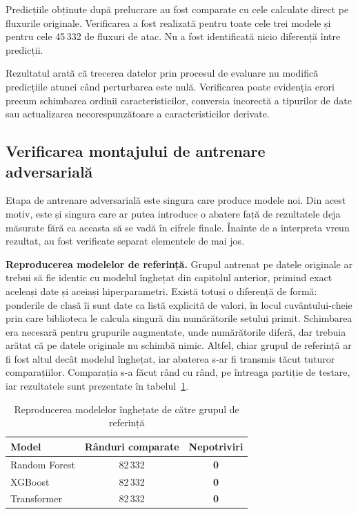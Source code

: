 Predicțiile obținute după prelucrare au fost comparate cu cele calculate direct pe fluxurile originale. Verificarea a fost realizată pentru toate cele trei modele și pentru cele 45\,332 de fluxuri de atac. Nu a fost identificată nicio diferență între predicții.

Rezultatul arată că trecerea datelor prin procesul de evaluare nu modifică predicțiile atunci când perturbarea este nulă. Verificarea poate evidenția erori precum schimbarea ordinii caracteristicilor, conversia incorectă a tipurilor de date sau actualizarea necorespunzătoare a caracteristicilor derivate.

\subsection{Verificarea montajului de antrenare adversarială}\label{subsec:val-adversarial}

Etapa de antrenare adversarială este singura care produce modele noi. Din acest motiv, este și singura care ar putea introduce o abatere față de rezultatele deja măsurate fără ca aceasta să se vadă în cifrele finale. Înainte de a interpreta vreun rezultat, au fost verificate separat elementele de mai jos.

\textbf{Reproducerea modelelor de referință.} Grupul antrenat pe datele originale ar trebui să fie identic cu modelul înghețat din capitolul anterior, primind exact aceleași date și aceiași hiperparametri. Există totuși o diferență de formă: ponderile de clasă îi sunt date ca listă explicită de valori, în locul cuvântului-cheie prin care biblioteca le calcula singură din numărătorile setului primit. Schimbarea era necesară pentru grupurile augmentate, unde numărătorile diferă, dar trebuia arătat că pe datele originale nu schimbă nimic. Altfel, chiar grupul de referință ar fi fost altul decât modelul înghețat, iar abaterea s-ar fi transmis tăcut tuturor comparațiilor. Comparația s-a făcut rând cu rând, pe întreaga partiție de testare, iar rezultatele sunt prezentate în tabelul~\ref{tab:reproducere}.

\begin{table}[!ht]
    \caption{Reproducerea modelelor înghețate de către grupul de referință}
    \centering
    \begin{tabular}{|l|c|c|}
        \hline
        \textbf{Model} & \textbf{Rânduri comparate} & \textbf{Nepotriviri} \\
        \hline
        Random Forest & 82\,332 & \textbf{0} \\
        \hline
        XGBoost & 82\,332 & \textbf{0} \\
        \hline
        Transformer & 82\,332 & \textbf{0} \\
        \hline
    \end{tabular}
    \label{tab:reproducere}
\end{table}

